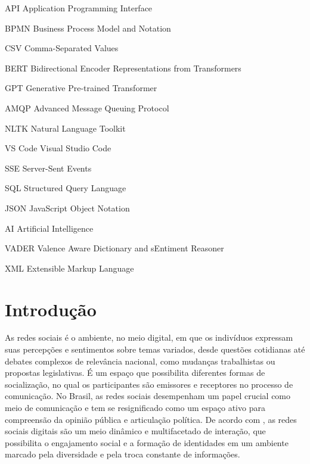 \documentclass[
	12pt,				%
	oneside,			%
	a4paper,			%
	english,			%
	french,				%
	spanish,			%
	brazil				%
	]{abntex2}
\begin{document}
\begin{siglas}
  \item[API] Application Programming Interface
  \item[BPMN] Business Process Model and Notation
  \item[CSV] Comma-Separated Values
  \item[BERT] Bidirectional Encoder Representations from Transformers
  \item[GPT] Generative Pre-trained Transformer
  \item[AMQP] Advanced Message Queuing Protocol
  \item[NLTK] Natural Language Toolkit
  \item[VS Code] Visual Studio Code
  \item[SSE] Server-Sent Events
  \item[SQL] Structured Query Language
  \item[JSON] JavaScript Object Notation
  \item[AI] Artificial Intelligence
  \item[VADER] Valence Aware Dictionary and sEntiment Reasoner
  \item[XML] Extensible Markup Language
\end{siglas}

\tableofcontents*
\cleardoublepage


\textual
\pagestyle{simple}                  %


\hypertarget{introduuxe7uxe3o}{%
\chapter{Introdução}\label{introduuxe7uxe3o}}

As redes sociais é o ambiente, no meio digital, em que os indivíduos
expressam suas percepções e sentimentos sobre temas variados, desde
questões cotidianas até debates complexos de relevância nacional, como
mudanças trabalhistas ou propostas legislativas. É um espaço que
possibilita diferentes formas de socialização, no qual os participantes
são emissores e receptores no processo de comunicação. No Brasil, as
redes sociais desempenham um papel crucial como meio de comunicação e
tem se resignificado como um espaço ativo para compreensão da opinião
pública e articulação política. De acordo com
, as redes sociais digitais são um meio
dinâmico e multifacetado de interação, que possibilita o engajamento
social e a formação de identidades em um ambiente marcado pela
diversidade e pela troca constante de informações.
\end{document}
